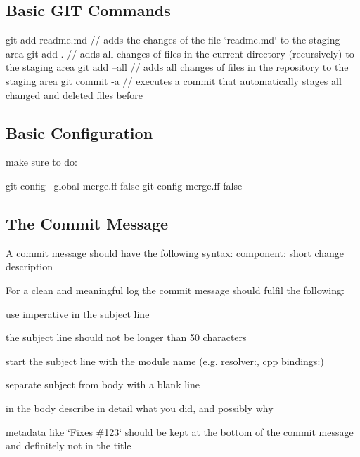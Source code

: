 \subsection*{Basic G\+IT Commands}

\begin{DoxyVerb}    git add readme.md   // adds the changes of the file `readme.md` to the staging area
    git add .           // adds all changes of files in the current directory (recursively) to the staging area
    git add --all       // adds all changes of files in the repository to the staging area
    git commit -a       // executes a commit that automatically stages all changed and deleted files before
\end{DoxyVerb}


\subsection*{Basic Configuration}

make sure to do\+: \begin{DoxyVerb}    git config --global merge.ff false
    git config merge.ff false
\end{DoxyVerb}


\subsection*{The Commit Message}

A commit message should have the following syntax\+: {\ttfamily component\+: short change description}

For a clean and meaningful log the commit message should fulfil the following\+:


\begin{DoxyItemize}
\item use imperative in the subject line
\item the subject line should not be longer than 50 characters
\item start the subject line with the module name (e.\+g. resolver\+:, cpp bindings\+:)
\item separate subject from body with a blank line
\item in the body describe in detail what you did, and possibly why
\item metadata like \char`\"{}\+Fixes \#123\char`\"{} should be kept at the bottom of the commit message and definitely not in the title
\end{DoxyItemize}

